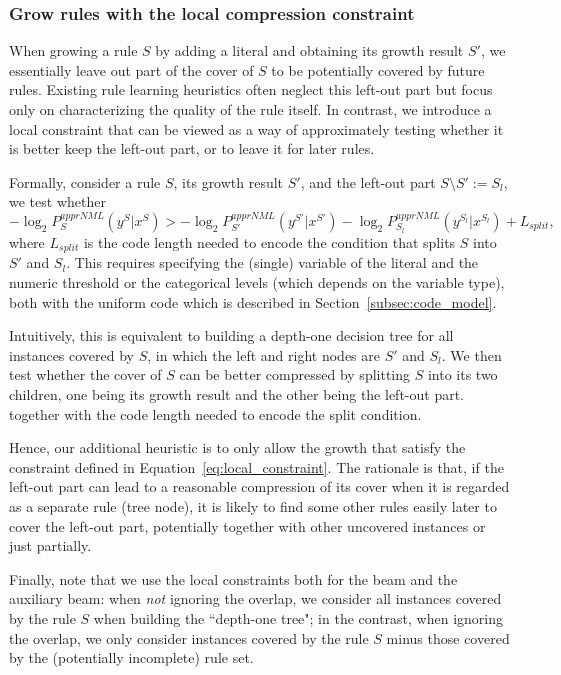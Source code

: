\subsubsection{Grow rules with the local compression constraint} \label{subsec:local_constraint}
When growing a rule $S$ by adding a literal and obtaining its growth result $S'$, we essentially leave out part of the cover of $S$ to be potentially covered by future rules. Existing rule learning heuristics often neglect this left-out part but focus only on characterizing the quality of the rule itself. In contrast, we introduce a local constraint that can be viewed as a way of approximately testing whether it is better keep the left-out part, or to leave it for later rules. 

Formally, consider a rule $S$, its growth result $S'$, and the left-out part $S \setminus S' := S_l$, we test whether 
\begin{equation} \label{eq:local_constraint}
	-\log_2 P_S^{apprNML}(y^S|x^S) > -\log_2 P_{S'}^{apprNML}(y^{S'}|x^{S'}) - \log_2 P_{S_l}^{apprNML}(y^{S_l}|x^{S_l}) + L_{split}, 
\end{equation}
where $L_{split}$ is the code length needed to encode the condition that splits $S$ into $S'$ and $S_l$. This requires specifying the (single) variable of the literal and the numeric threshold or the categorical levels (which depends on the variable type), both with the uniform code which is described in Section~\ref{subsec:code_model}. 

Intuitively, this is equivalent to building a depth-one decision tree for all instances covered by $S$, in which the left and right nodes are $S'$ and $S_l$. We then test whether the cover of $S$ can be better compressed by splitting $S$ into its two children, one being its growth result and the other being the left-out part. together with the code length needed to encode the split condition. 

Hence, our additional heuristic is to only allow the growth that satisfy the constraint defined in Equation~\ref{eq:local_constraint}. The rationale is that, if the left-out part can lead to a reasonable compression of its cover when it is regarded as a separate rule (tree node), it is likely to find some other rules easily later to cover the left-out part, potentially together with other uncovered instances or just partially. 

Finally, note that we use the local constraints both for the beam and the auxiliary beam: when \emph{not} ignoring the overlap, we consider all instances covered by the rule $S$ when building the ``depth-one tree"; in the contrast, when ignoring the overlap, we only consider instances covered by the rule $S$ minus those covered by the (potentially incomplete) rule set. 

